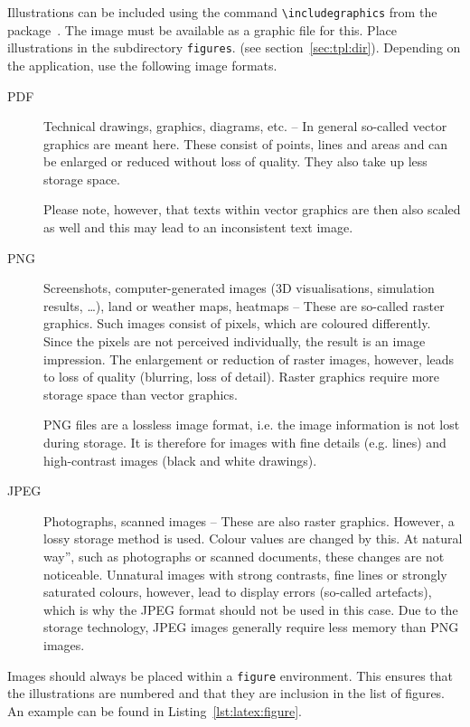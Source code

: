 Illustrations can be included using the command \lstinline+\includegraphics+
from the package~. The image must be available as a graphic
file for this. Place illustrations in the subdirectory \texttt{figures}.
(see section~\ref{sec:tpl:dir}). Depending on the application, use the
following image formats.

\begin{description}
\item[PDF] Technical drawings, graphics, diagrams, etc. -- In general
  so-called vector graphics are meant here. These consist of points, lines
  and areas and can be enlarged or reduced without loss of quality.
  They also take up less storage space.

  Please note, however, that texts within vector graphics are then also
  scaled as well and this may lead to an inconsistent text image.

\item[PNG] Screenshots, computer-generated images (3D visualisations,
  simulation results, \dots), land or weather maps, heatmaps -- These are so-called
  raster graphics. Such images consist of pixels, which are coloured
  differently. Since the pixels are not perceived individually, the result is
  an image impression. The enlargement or reduction of raster images, however,
  leads to loss of quality (blurring, loss of detail). Raster graphics
  require more storage space than vector graphics.

  PNG files are a lossless image format, i.e. the image information is not lost
  during storage. It is therefore for images with fine details (e.g. lines) and
  high-contrast images (black and white drawings).

\item[JPEG] Photographs, scanned images -- These are also raster graphics.
  However, a lossy storage method is used. Colour values are changed by this.
  At natural way'', such as photographs or scanned documents, these changes are
  not noticeable. Unnatural images with strong contrasts, fine lines or
  strongly saturated colours, however, lead to display errors
  (so-called artefacts), which is why the JPEG format should not be used in
  this case. Due to the storage technology, JPEG images generally require less
  memory than PNG images.
\end{description}

Images should always be placed within a \texttt{figure} environment. This ensures that
the illustrations are numbered and that they are inclusion in the list of
figures. An example can be found in Listing~\ref{lst:latex:figure}.


